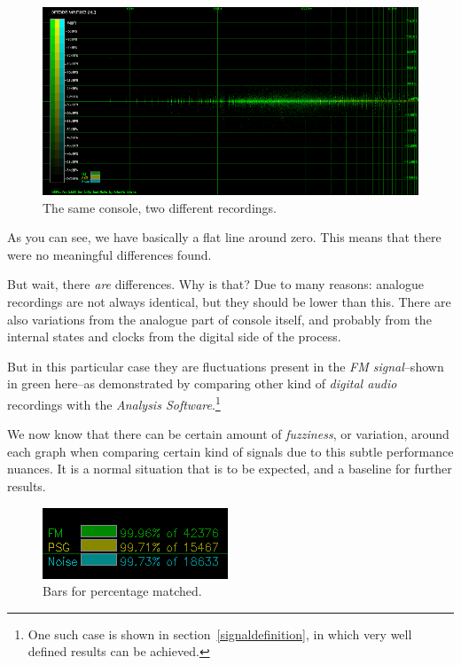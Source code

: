 \documentclass[10pt,a4paper]{report}
\begin{document}
\begin{figure}[H]
	\centering
	\includegraphics[width=1\linewidth]{images/interpretation/Plot2-Sameconsole.png}
	\caption[Same console compared]{The same console, two different recordings.}
	\label{fig:plot2-sameconsole}
\end{figure}

As you can see, we have basically a flat line around zero. This means that there were no meaningful differences found. 

But wait, there \textit{are} differences. Why is that? Due to many reasons: analogue recordings are not always identical, but they should be lower than this. There are also variations from the analogue part of console itself, and probably from the internal states and clocks from the digital side of the process. 

But in this particular case they are fluctuations present in the \textit{FM signal}--shown in green here--as demonstrated by comparing other kind of \textit{digital audio} recordings with the \textit{Analysis Software}.\footnote{One such case is shown in section~\ref{signaldefinition}, in which very well defined results can be achieved.}

We now know that there can be certain amount of \textit{fuzziness}, or variation, around each graph when comparing certain kind of signals due to this subtle performance nuances. It is a normal situation that is to be expected, and a baseline for further results.

\begin{figure}[H]
	\centering
	\includegraphics[width=0.4\linewidth]{images/interpretation/Plot2-Sameconsole-bars.png}
	\caption[Bars]{Bars for percentage matched.}
	\label{fig:plot2-sameconsole-bars}
\end{figure}
\end{document}
